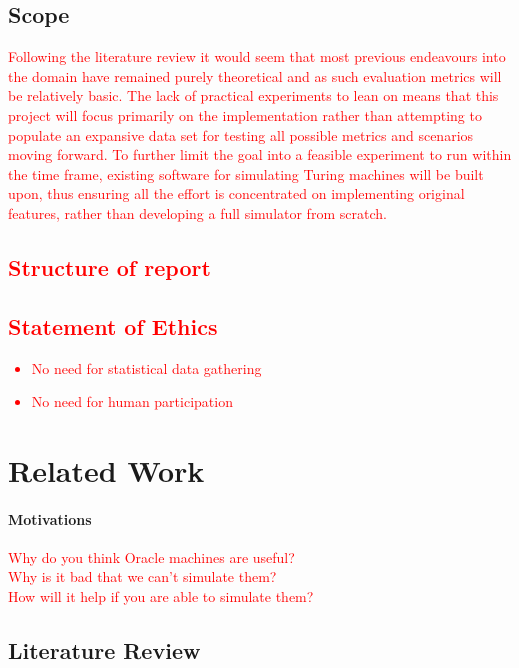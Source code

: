 \documentclass[12pt,a4,xcolor=table]{article}
\begin{document}
	\subsection{Scope}
	\textcolor{red}{
		Following the literature review it would seem that most previous endeavours into the domain have remained purely theoretical and as such evaluation metrics will be relatively basic. The lack of practical experiments to lean on means that this project will focus primarily on the implementation rather than attempting to populate an expansive data set for testing all possible metrics and scenarios moving forward. To further limit the goal into a feasible experiment to run within the time frame, existing software for simulating Turing machines will be built upon, thus ensuring all the effort is concentrated on implementing original features, rather than developing a full simulator from scratch.
	}

	\textcolor{red}{
		\subsection{Structure of report}
	}
	\textcolor{red}{
		\subsection{Statement of Ethics}
		\begin{itemize}
			\item No need for statistical data gathering
			\item No need for human participation
		\end{itemize}
	}

	
	\section{Related Work}
	\paragraph{Motivations}
	\textcolor{red}{
		Why do you think Oracle machines are useful? \\
		Why is it bad that we can't simulate them? \\
		How will it help if you are able to simulate them?
	}
	\subsection{Literature Review}
\end{document}
